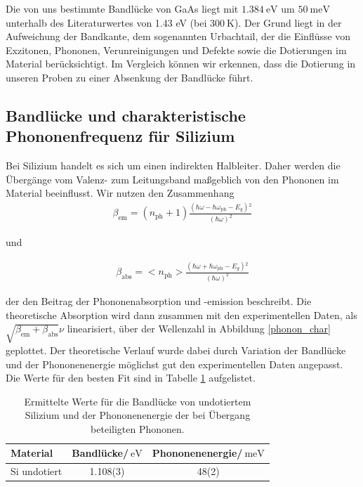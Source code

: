 \documentclass[paper=a4,fontsize=10pt,DIV=18,twocolumn,parskip=half]{scrartcl}
\numberwithin{equation}{section}    %
\begin{document}
Die von uns bestimmte Bandlücke von GaAs liegt mit $\SI{1.384}{\eV}$ um 
$\SI{50}{\milli\eV}$ unterhalb des Literaturwertes von 1.43 eV (bei 
$\SI{300}{\K}$). Der Grund liegt in der Aufweichung der Bandkante, dem 
sogenannten Urbachtail, der die Einflüsse von
Exzitonen, Phononen, Verunreinigungen und Defekte sowie die Dotierungen im 
Material berücksichtigt. Im Vergleich können wir erkennen, dass die Dotierung in 
unseren Proben zu einer Absenkung der Bandlücke führt.

\subsection{Bandlücke und charakteristische Phononenfrequenz für Silizium}

Bei Silizium handelt es sich um einen indirekten Halbleiter. Daher werden die 
Übergänge vom Valenz- zum Leitungsband maßgeblich von den Phononen im Material 
beeinflusst. Wir nutzen den Zusammenhang
\begin{align}
    \beta _{\text{em} }=\left(n_{\text{ph}}+1\right)\frac{\left(\hbar \omega 
    -\hbar \omega _{\text{ph}}-E_g\right){}^2}{(\hbar \omega )^2}
\end{align}

und 

\begin{align}
    \beta _{\text{abs} }=<n_{\text{ph}}>\frac{\left(\hbar \omega +\hbar \omega 
    _{\text{ph}}-E_g\right){}^2}{(\hbar \omega )^2}
\end{align}

der den Beitrag der Phononenabsorption und \mbox{-emission} beschreibt. Die 
theoretische Absorption wird dann zusammen mit den experimentellen Daten, als 
$\sqrt{\beta _{\text{em} }+\beta _{\text{abs} }}\nu $ linearisiert, über der 
Wellenzahl in Abbildung \ref{phonon_char} geplottet. Der theoretische Verlauf wurde dabei durch 
Variation der Bandlücke und der Phononenenergie möglichst gut den 
experimentellen Daten angepasst. Die Werte für den besten Fit sind in Tabelle \ref{phe} 
aufgelistet.
\begin{table}
    \begin{center}
\begin{tabular}{ l | c c }
  Material & Bandlücke/$\SI{}{\eV}$ & Phononenenergie/$\SI{}{\milli\eV}$\\
  \hline
  Si undotiert & 1.108(3) & 48(2)
\end{tabular}
  \caption{Ermittelte Werte für die Bandlücke von undotiertem Silizium und der 
  Phononenenergie der bei Übergang beteiligten Phononen.}
  \label{phe}
    \end{center}
\end{table}
\end{document}

